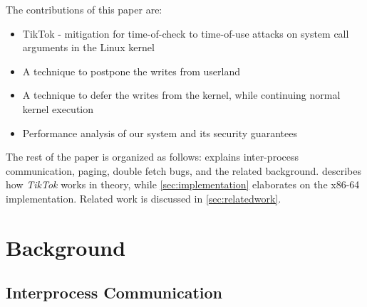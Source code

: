 
The contributions of this paper are:
\begin{itemize}
\item TikTok - mitigation for time-of-check to time-of-use attacks on system 
      call arguments in the Linux kernel
\item A technique to postpone the writes from userland
\item A technique to defer the writes from the kernel, while continuing normal
      kernel execution
\item {}Performance analysis of our system and its security guarantees
\end{itemize}

The rest of the paper is organized as follows:  explains 
inter-process communication, paging, double fetch bugs, and the related
background.  describes how \emph{TikTok} works in theory, while
\cref{sec:implementation} elaborates on the x86-64 implementation. Related work
is discussed in \cref{sec:relatedwork}.

\section{Background}

\label{sec:background}
\subsection{Interprocess Communication}

